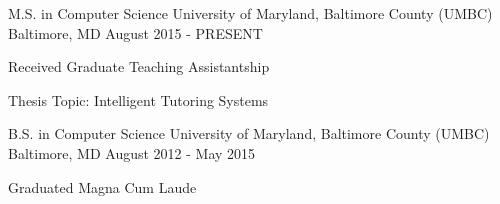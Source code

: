 \begin{cventries}
    \cventry
        {M.S. in Computer Science}
        {University of Maryland, Baltimore County (UMBC)}
        {Baltimore, MD}
        {August 2015 - PRESENT}
        {
            \begin{cvitems}
                \item {Received Graduate Teaching Assistantship}
                \item {Thesis Topic: Intelligent Tutoring Systems}
            \end{cvitems}
        }
    \cventry
        {B.S. in Computer Science}
        {University of Maryland, Baltimore County (UMBC)}
        {Baltimore, MD}
        {August 2012 - May 2015}
        {
            \begin{cvitems}
            \item {Graduated Magna Cum Laude}
            \end{cvitems}
        }
\end{cventries}
